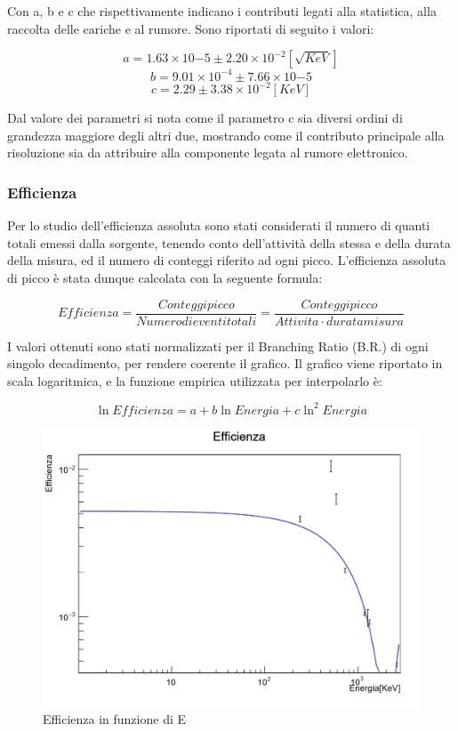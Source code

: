\documentclass[a4paper,10pt]{article}
\begin{document}
Con a, b e c che rispettivamente indicano i contributi legati alla statistica, alla raccolta delle cariche e al rumore. Sono riportati di seguito i valori:

$$
	a=1.63 \times 10{-5} \pm 2.20 \times 10^{-2} [\sqrt{KeV}]
$$
$$
	b=9.01 \times 10^{-4} \pm 7.66 \times 10{-5}
$$
$$
	c= 2.29 \pm 3.38 \times 10^{-2} [KeV]
$$

Dal valore dei parametri si nota come il parametro c sia diversi ordini di grandezza maggiore degli altri due, mostrando come il contributo principale alla risoluzione sia da attribuire alla componente legata al rumore elettronico.


\subsubsection{Efficienza}
Per lo studio dell'efficienza assoluta sono stati considerati il numero di quanti totali emessi dalla sorgente, tenendo conto dell'attivit\`a della stessa e della durata della misura, ed il numero di conteggi riferito ad ogni picco. L'efficienza assoluta di picco \`e stata dunque calcolata con la seguente formula:

\begin{equation}
	Efficienza=\frac{Conteggi picco}{Numero di eventi totali}=\frac{Conteggi picco}{Attivita \cdot durata misura}
\end{equation}

I valori ottenuti sono stati normalizzati per il Branching Ratio (B.R.) di ogni singolo decadimento, per rendere coerente il grafico. Il grafico viene riportato in scala logaritmica, e la funzione empirica utilizzata per interpolarlo \`e:

\begin{equation}
	\ln{Efficienza}=a + b\ln{Energia} + c\ln^{2}{Energia}
\end{equation}

\begin{figure}[H]
    \centering
    \includegraphics[scale=0.45]{grafici/efficienzasources}
    \caption{Efficienza in funzione di E}
\end{figure}
\end{document}

